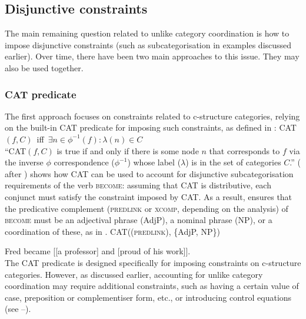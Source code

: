 \documentclass[output=paper]{../langscibook}
\begin{document}
\subsection{Disjunctive constraints}
\label{sec:Coordination:unlikes:disj}

The main remaining question related to unlike category coordination is how to
impose disjunctive constraints (such as subcategorisation in examples
discussed earlier). Over time, there have been two main
approaches to this issue. They may also be used together.

\subsubsection{CAT predicate}
\label{sec:Coordination:unlikes:disj:CAT}

The first approach focuses on constraints related to c-structure
categories, relying on the built-in CAT predicate for imposing such
constraints, as defined in :
\ea\label{ex:CAT:dalr:17:24} CAT$(f, C)$ \,iff \,$\exists n \in \phi^{-1}(f): \lambda(n) \in C$ \\ [1ex]
“CAT$(f , C)$ is true if and only if there is some node $n$ that corresponds to $f$ via
the inverse $\phi$ correspondence ($\phi^{-1}$) whose label
($\lambda$) is in the set of categories $C$.”
\hfill(\citet[(24)]{dalr:17} after \citet[93]{kaplanmaxwell96})
\z
\citet{dalr:17} shows how CAT can be used to account
for disjunctive subcategorisation requirements of the verb
\textsc{become}: assuming that CAT is distributive, each conjunct must
satisfy the constraint imposed by CAT. As a result,
 ensures that the predicative complement
(\textsc{predlink} or \textsc{xcomp}, depending on the analysis) of
\textsc{become} must be an adjectival phrase (AdjP), a nominal phrase (NP),
or a coordination of these, as in .
\ea\label{ex:CAT:dalr:17:26} CAT((\UP \textsc{predlink}), \{AdjP, NP\}) \hfill\citep[(26)]{dalr:17}
  \item\label{ex:CAT:dalr:17:27} Fred became [[a professor] and [proud of his work]]. \\\hfill\citep[(6a)]{dalr:17}
\z
The CAT predicate is designed specifically for
imposing constraints on c-struc\-ture categories. However, as discussed
earlier, accounting for unlike category coordination may require additional
constraints, such as having a certain value of case, preposition or
complementiser form, etc., or introducing control equations (see
–).
\end{document}
